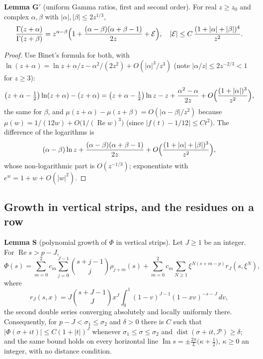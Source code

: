 \documentclass[11pt]{article}
\newcommand{\re}{\operatorname{Re}}
\newcommand{\im}{\operatorname{Im}}
\newcommand{\dist}{\operatorname{dist}}
\begin{document}
\medskip
\noindent\textbf{Lemma G$'$} (uniform Gamma ratios, first and second order). For real $z\ge z_0$ and complex $\alpha,\beta$ with $|\alpha|,|\beta|\le2z^{1/3}$,
\[
\frac{\Gamma(z+\alpha)}{\Gamma(z+\beta)}=z^{\alpha-\beta}\Bigl(1+\frac{(\alpha-\beta)(\alpha+\beta-1)}{2z}+\mathcal{E}\Bigr),\quad|\mathcal{E}|\le C\,\frac{(1+|\alpha|+|\beta|)^4}{z^2}.
\]

\begin{proof}
Use Binet's formula for both, with $\ln(z+\alpha)=\ln z+\alpha/z-\alpha^2/(2z^2)+O(|\alpha|^3/z^3)$ (note $|\alpha/z|\le2z^{-2/3}<1$ for $z\ge3$):
\[
\bigl(z+\alpha-\tfrac12\bigr)\ln(z+\alpha)-(z+\alpha)=\bigl(z+\alpha-\tfrac12\bigr)\ln z-z+\frac{\alpha^2-\alpha}{2z}+O\Bigl(\frac{(1+|\alpha|)^3}{z^2}\Bigr),
\]
the same for $\beta$, and $\mu(z+\alpha)-\mu(z+\beta)=O(|\alpha-\beta|/z^2)$ because $\mu(w)=1/(12w)+O\bigl(1/(\re w)^3\bigr)$ (since $|f(t)-1/12|\le Ct^2$). The difference of the logarithms is
\[
(\alpha-\beta)\ln z+\frac{(\alpha-\beta)(\alpha+\beta-1)}{2z}+O\Bigl(\frac{(1+|\alpha|+|\beta|)^3}{z^2}\Bigr),
\]
whose non-logarithmic part is $O(z^{-1/3})$; exponentiate with $e^w=1+w+O(|w|^2)$.
\end{proof}

\subsection{Growth in vertical strips, and the residues on a row}

\noindent\textbf{Lemma S} (polynomial growth of $\Phi$ in vertical strips). Let $J\ge1$ be an integer. For $\re s>p-J$,
\[
\Phi(s)=\sum_{m=0}^{2}c_m\sum_{j=0}^{J-1}\binom{s+j-1}{j}\rho_{j+m}(s)+\sum_{m=0}^{2}c_m\sum_{N\ge1}\xi^{N(s+m-p)}r_J(s,\xi^N),
\]
where
\[
r_J(s,x)=J\binom{s+J-1}{J}x^J\int_0^1(1-v)^{J-1}(1-xv)^{-s-J}\,dv,
\]
the second double series converging absolutely and locally uniformly there. Consequently, for $p-J<\sigma_1\le\sigma_2$ and $\delta>0$ there is $C$ such that $|\Phi(\sigma+it)|\le C(1+|t|)^J$ whenever $\sigma_1\le\sigma\le\sigma_2$ and $\dist(\sigma+it,\mathcal{P})\ge\delta$; and the same bound holds on every horizontal line $\im s=\pm\frac{2\pi}{L}\bigl(\kappa+\frac12\bigr)$, $\kappa\ge0$ an integer, with no distance condition.
\end{document}
